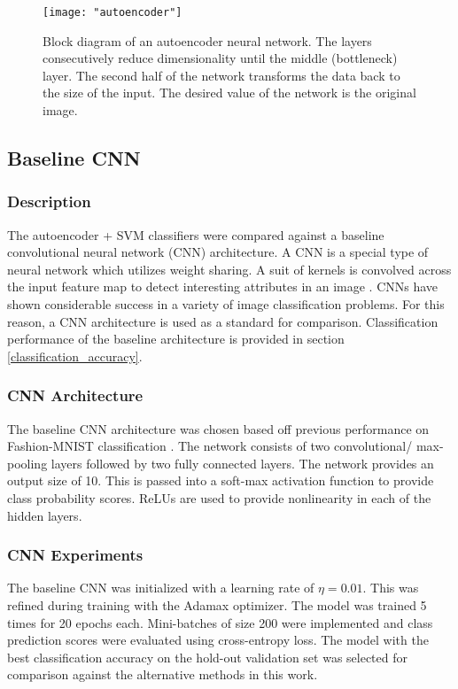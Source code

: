 \documentclass[conference]{IEEEtran}
\begin{document}
	 \begin{center}
	 	\begin{figure}[t]
	 		\centering
	 		\texttt{[image: "autoencoder"]}
	 		\caption{Block diagram of an autoencoder neural network.  The layers consecutively reduce dimensionality until the middle (bottleneck) layer.  The second half of the network transforms the data back to the size of the input.  The desired value of the network is the original image.}
	 		\label{fig:autoencoder}
	 	\end{figure}
	 \end{center}
	 
	 \vspace{-1.3cm}
	 \subsection{Baseline CNN}
	 
	 \subsubsection*{Description}
	 The autoencoder + SVM classifiers were compared against a baseline convolutional neural network (CNN) architecture.  A CNN is a special type of neural network which utilizes weight sharing. A suit of kernels is convolved across the input feature map to detect interesting attributes in an image \cite{Goodfellow2016DeepLearning,Haykin2009NeuralNetworks}.  CNNs have shown considerable success in a variety of image classification problems.  For this reason, a CNN architecture is used as a standard for comparison.  Classification performance of the baseline architecture is provided in section \ref{classification_accuracy}.
	 
	 \subsubsection*{CNN Architecture}
	 The baseline CNN architecture was chosen based off previous performance on Fashion-MNIST classification \cite{Xiao2017FashionMNIST}.  The network consists of two convolutional/ max-pooling layers followed by two fully connected layers.  The network provides an output size of 10.  This is passed into a soft-max activation function to provide class probability scores.  ReLUs are used to provide nonlinearity in each of the hidden layers. 
	 
	 \subsubsection*{CNN Experiments}
	 The baseline CNN was initialized with a learning rate of $\eta=0.01$.  This was refined during training with the Adamax optimizer.  The model was trained 5 times for 20 epochs each.  Mini-batches of size 200 were implemented and class prediction scores were evaluated using cross-entropy loss.  The model with the best classification accuracy on the hold-out validation set was selected for comparison against the alternative methods in this work.  
	 
\end{document}
